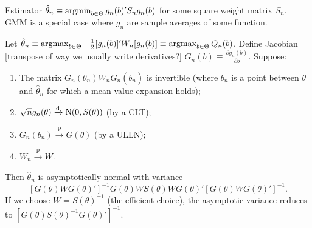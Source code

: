 \documentclass[8pt,letterpaper, landscape]{extarticle} %
\begin{document}
\begin{multicols}{3}
\begin{description}
 Estimator $ \hat{\theta}_n \equiv \operatorname*{argmin}_{b \in \Theta} g_n(b)' S_n g_n(b) $ for some square weight matrix $ S_n $. GMM is a special case where $ g_n $ are sample averages of some function.

 Let $ \hat{\theta}_n \equiv \operatorname*{argmax}_{b \in \Theta} - \frac{1}{2} [g_n(b)]' W_n [g_n(b)] \equiv \operatorname*{argmax}_{b \in \Theta} Q_n(b) $. Define Jacobian [transpose of way we usually write derivatives?] $ G_n(b) \equiv \frac{\partial g_n(b)}{\partial b} $. Suppose:
\begin{enumerate}
\item The matrix $ G_n(\theta_n) W_n G_n (\bar{b}_n) $ is invertible (where $ \bar{b}_n $ is a point between $ \theta $ and $ \hat{\theta}_n $ for which a mean value expansion holds);
\item $ \sqrt{n} g_n (\theta) \xrightarrow{\text{d}} \operatorname{N} (0, S(\theta)) $ (by a CLT);
\item $ G_n (b_n) \xrightarrow{\text{p}} G(\theta) $ (by a ULLN);
\item $ W_n \xrightarrow{\text{p}} W $.
\end{enumerate}
Then $ \hat{\theta}_n $ is asymptotically normal with variance
$$ [G(\theta) W G(\theta)']^{-1} G(\theta) W S(\theta) W G(\theta)' [G(\theta) W G(\theta)']^{-1}. $$
If we choose $ W = S(\theta)^{-1} $ (the efficient choice), the asymptotic variance reduces to $ [G(\theta) S(\theta)^{-1} G(\theta)']^{-1} $.


\end{description}
\end{multicols}
\end{document}
